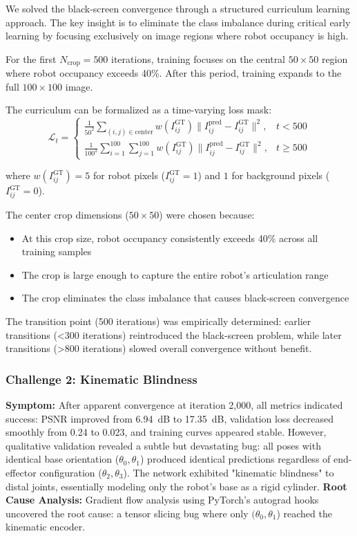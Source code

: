 \documentclass[12pt,a4paper,oneside]{report}
\begin{document}
We solved the black-screen convergence through a structured curriculum learning approach. The key insight is to eliminate the class imbalance during critical early learning by focusing exclusively on image regions where robot occupancy is high.

For the first $N_{\text{crop}} = 500$ iterations, training focuses on the central $50 \times 50$ region where robot occupancy exceeds 40\%. After this period, training expands to the full $100 \times 100$ image.

The curriculum can be formalized as a time-varying loss mask:
\begin{equation}\mathcal{L}_t = \begin{cases}
\frac{1}{50^2} \sum_{(i,j) \in \text{center}} w(I_{ij}^{\text{GT}}) \|I_{ij}^{\text{pred}} - I_{ij}^{\text{GT}}\|^2, & t < 500 \\
\frac{1}{100^2} \sum_{i=1}^{100}\sum_{j=1}^{100} w(I_{ij}^{\text{GT}}) \|I_{ij}^{\text{pred}} - I_{ij}^{\text{GT}}\|^2, & t \geq 500
\end{cases}
\end{equation}

where $w(I_{ij}^{\text{GT}}) = 5$ for robot pixels ($I_{ij}^{\text{GT}} = 1$) and $1$ for background pixels ($I_{ij}^{\text{GT}} = 0$).

The center crop dimensions ($50 \times 50$) were chosen because:
\begin{itemize}
    \item At this crop size, robot occupancy consistently exceeds 40\% across all training samples

    \item The crop is large enough to capture the entire robot's articulation range

    \item The crop eliminates the class imbalance that causes black-screen convergence

\end{itemize}

The transition point (500 iterations) was empirically determined: earlier transitions (<300 iterations) reintroduced the black-screen problem, while later transitions (>800 iterations) slowed overall convergence without benefit.
\subsubsection{Challenge 2: Kinematic Blindness}
\label{subsubsec:challenge_2_kinematic_blindness}
\textbf{Symptom:} After apparent convergence at iteration 2,000, all metrics indicated success: PSNR improved from 6.94~dB to 17.35~dB, validation loss decreased smoothly from 0.24 to 0.023, and training curves appeared stable. However, qualitative validation revealed a subtle but devastating bug: all poses with identical base orientation ($\theta_0, \theta_1$) produced identical predictions regardless of end-effector configuration ($\theta_2, \theta_3$). The network exhibited "kinematic blindness" to distal joints, essentially modeling only the robot's base as a rigid cylinder.
\textbf{Root Cause Analysis:} Gradient flow analysis using PyTorch's autograd hooks uncovered the root cause: a tensor slicing bug where only $(\theta_0, \theta_1$) reached the kinematic encoder.
\end{document}
